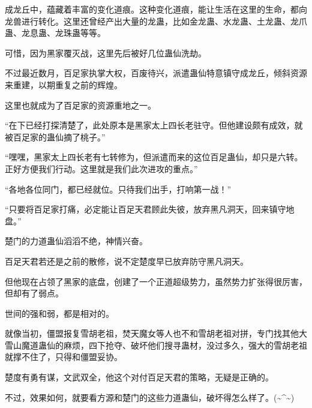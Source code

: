 \begin{this_body}
成龙丘中，蕴藏着丰富的变化道痕。这种变化道痕，能让生活在这里的生命，都向龙兽进行转化。这里还曾经产出大量的龙蛊，比如金龙蛊、水龙蛊、土龙蛊、龙爪蛊、龙息蛊、龙珠蛊等等。

可惜，因为黑家覆灭战，这里先后被好几位蛊仙洗劫。

不过最近数月，百足家执掌大权，百废待兴，派遣蛊仙特意镇守成龙丘，倾斜资源来重建，以期重复之前的辉煌。

这里也就成为了百足家的资源重地之一。

“在下已经打探清楚了，此处原本是黑家太上四长老驻守。但他建设颇有成效，就被百足家的蛊仙摘了桃子。”

“嘿嘿，黑家太上四长老有七转修为，但派遣而来的这位百足蛊仙，却只是六转。正好方便我们行动。这里就是我们此次进攻的重点。”

“各地各位同门，都已经就位。只待我们出手，打响第一战！”

“只要将百足家打痛，必定能让百足天君顾此失彼，放弃黑凡洞天，回来镇守地盘。”

楚门的力道蛊仙滔滔不绝，神情兴奋。

百足天君若还是之前的散修，说不定楚度早已放弃防守黑凡洞天。

但他现在占领了黑家的底盘，创建了一个正道超级势力，虽然势力扩张得很厉害，但却有了弱点。

世间的强和弱，都是相对的。

就像当初，僵盟报复雪胡老祖，焚天魔女等人也不和雪胡老祖对拼，专门找其他大雪山魔道蛊仙的麻烦，四下抢夺、破坏他们搜寻蛊材，没过多久，强大的雪胡老祖就撑不住了，只得和僵盟妥协。

楚度有勇有谋，文武双全，他这个对付百足天君的策略，无疑是正确的。

不过，效果如何，就要看方源和楚门的这些力道蛊仙，破坏得怎么样了。(\~{}\^{}\~{})

\end{this_body}

